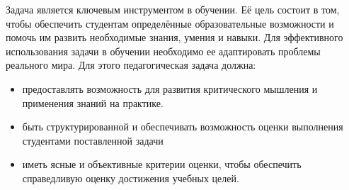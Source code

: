 Задача является ключевым инструментом в обучении. 
Её цель состоит в том, чтобы обеспечить студентам определённые образовательные возможности и помочь им развить необходимые знания, умения и навыки.
Для эффективного использования задачи в обучении необходимо ее адаптировать проблемы реального мира.
 Для этого педагогическая задача должна:
\begin{itemize}
    \item предоставлять возможность для развития критического мышления и применения знаний на практике.
    \item быть структурированной и обеспечивать возможность оценки выполнения студентами поставленной задачи
    \item иметь ясные и объективные критерии оценки, чтобы обеспечить справедливую оценку достижения учебных целей.
\end{itemize}




